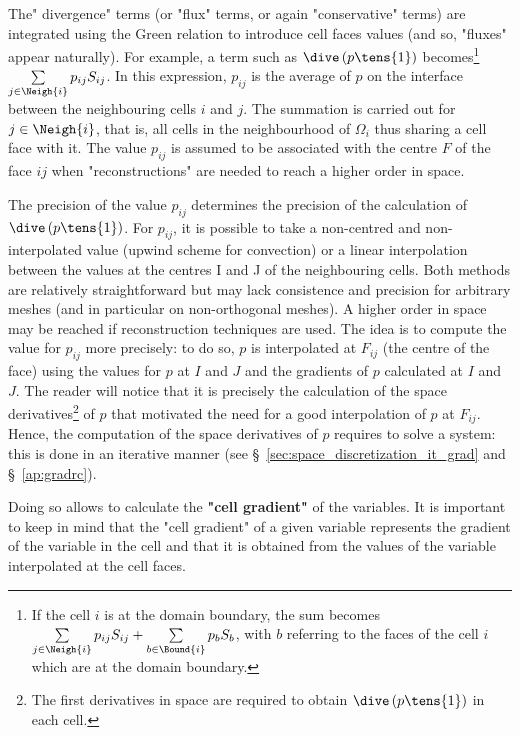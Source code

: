The" divergence" terms (or "flux" terms, or again "conservative"
terms) are integrated using the Green relation to introduce cell faces
values (and so, "fluxes" appear naturally). For example, a term such as 
$\dive \left(p \tens{1}\right)$ becomes\footnote{%
If the cell $i$ is at the domain boundary, the sum becomes 
$\sum\limits_{j\in \Neigh{i}}p_{ij}S_{ij}+\sum\limits_{b \in \Bound{i}
}p_{b}S_{b}$, 
with $b$ referring to the faces
of the cell $i$ which are at the domain boundary.} 
$\sum\limits_{j \in \Neigh{i}} p_{ij}S_{ij}$.
In this expression, $p_{ij}$
is the average of $p$ on the interface between the neighbouring cells $i$
and $j$. The summation is carried out for $j\in \Neigh{i}$, that is, all
cells in the neighbourhood of $\Omega_{i}$ thus sharing a cell face with
it. The value $p_{ij}$ is
assumed to be associated with the centre $F$
 of the face $ij$ when
"reconstructions" are needed to reach a higher order in space.

The precision of the value $p_{ij}$ determines the precision of the
calculation of $\dive \left(p \tens{1}\right)$. For $p_{ij}$, it is possible to take a non-centred
and non-interpolated value (upwind scheme for convection) or a linear
interpolation between the values at the centres I and J of the neighbouring
cells. Both methods are relatively straightforward but may lack consistence
and precision for arbitrary meshes (and in particular on non-orthogonal
meshes). A higher order in space may be reached if reconstruction techniques
are used. The idea is to compute the value for $p_{ij}$ more precisely: to
do so, $p$ is interpolated at $F_{ij}$ (the centre of the face) using the
values for $p$ at $I$ and $J$ and the gradients of $p$ calculated at $I$ and $J$.
The reader will notice that it is precisely the calculation of the space
derivatives\footnote{%
The first derivatives in space are required to obtain $\dive \left(p \tens{1}\right)$ in each cell.}
of $p$ that motivated the need for a good interpolation of $p$ at $F_{ij}$.
Hence, the computation of the space derivatives of $p$ requires to solve a
system: this is done in an iterative manner (see \S~\ref{sec:space_discretization_it_grad} and \S~\ref{ap:gradrc}).

Doing so allows to calculate the \textbf{"cell gradient"} of the variables.
It is important to keep in mind that the "cell gradient" of a given variable
represents the gradient of the variable in the cell and that it is obtained
from the values of the variable interpolated at the cell faces.

